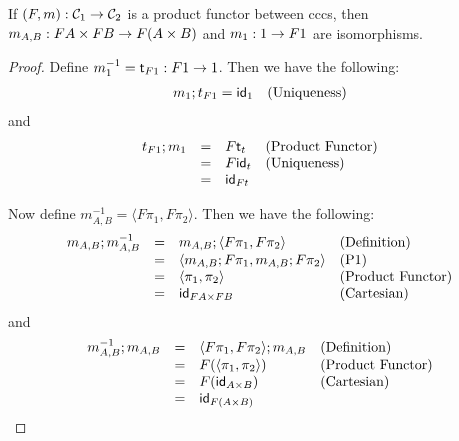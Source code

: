 \begin{lemma}
  \label{lemma:product_functors_iso}
  If $(F,m) : \mathcal{C}_1 \rightarrow \mathcal{C}_2$ is a product functor between cccs, then
  $m_{A,B} : FA \times FB \rightarrow F(A \times B)$ and $m_1 : 1 \rightarrow F1$ are
  isomorphisms.
\end{lemma}
\begin{proof}
  Define $m^{-1}_1 = \mathsf{t}_{F 1} : F1 \rightarrow 1$.  Then we have the following:
  \[
  \begin{array}{lll}
    m_1;t_{F1} = \mathsf{id}_{1} & \text{(Uniqueness)}\\    
  \end{array}
  \]
  and
  \[
  \begin{array}{llll}
    t_{F1};m_1
    & = & F\mathsf{t}_t & \text{(Product Functor)}\\
    & = & F\mathsf{id}_t & \text{(Uniqueness)}\\
    & = & \mathsf{id}_{Ft}     
  \end{array}
  \]

  Now define $m^{-1}_{A,B} = \langle F\pi_1, F\pi_2 \rangle$.  Then we have the following:
  \[
  \begin{array}{llll}
    m_{A,B};m^{-1}_{A,B}
    & = & m_{A,B};\langle F\pi_1, F\pi_2 \rangle & \text{(Definition)}\\
    & = & \langle m_{A,B};F\pi_1, m_{A,B};F\pi_2 \rangle & \text{(P1)}\\
    & = & \langle \pi_1, \pi_2 \rangle & \text{(Product Functor)}\\
    & = & \mathsf{id}_{FA \times FB} & \text{(Cartesian)}\\
  \end{array}
  \]
  and
  \[
  \begin{array}{llll}
    m^{-1}_{A,B};m_{A,B}
    & = & \langle F\pi_1, F\pi_2 \rangle;m_{A,B} & \text{(Definition)}\\
    & = & F(\langle \pi_1, \pi_2 \rangle) & \text{(Product Functor)}\\
    & = & F(\mathsf{id}_{A \times B}) & \text{(Cartesian)}\\
    & = & \mathsf{id}_{F(A \times B)}\\    
  \end{array}
  \]
\end{proof}

